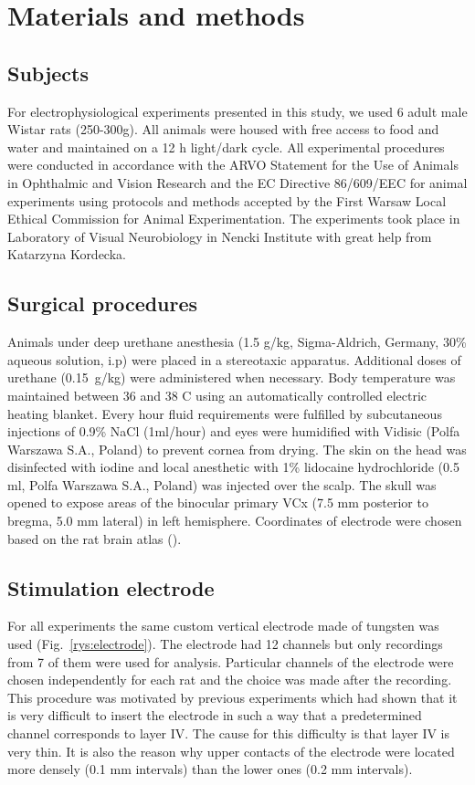 \documentclass{pracalicmgr}
\begin{document}
   \chapter{Materials and methods}   
   \section{Subjects}
   For electrophysiological experiments presented in this study, we used 6 adult male Wistar rats (250-300g). All animals were housed with free access to food and water and maintained on a 12 h light/dark cycle. All experimental procedures  were conducted in accordance with the ARVO Statement for the Use of Animals in Ophthalmic and Vision Research and  the EC Directive 86/609/EEC for animal experiments using protocols and methods accepted by the First Warsaw Local Ethical Commission for Animal Experimentation. The experiments took place in Laboratory of Visual Neurobiology in Nencki Institute with great help from Katarzyna Kordecka.
   
   
   \section{Surgical procedures}
   Animals under deep urethane anesthesia (1.5 g/kg, Sigma-Aldrich, Germany, 30\% aqueous solution, i.p) were placed in a stereotaxic apparatus. Additional doses of urethane (0.15~g/kg) were administered when necessary. Body temperature was maintained between 36 and 38 \degree C using an automatically controlled electric heating blanket. Every hour fluid requirements were fulfilled by subcutaneous injections of 0.9\% NaCl (1ml/hour) and eyes were humidified with Vidisic (Polfa Warszawa S.A., Poland) to prevent cornea from drying. The skin on the head was disinfected with iodine and local anesthetic with 1\% lidocaine hydrochloride (0.5 ml, Polfa Warszawa S.A., Poland) was injected over the scalp. The skull was opened to expose areas of the binocular primary VCx (7.5 mm posterior to bregma, 5.0 mm lateral) in left hemisphere. Coordinates of electrode were chosen based on the rat brain atlas (\cite{atlas}). 
   
   \section{Stimulation electrode}
   For all experiments the same custom vertical electrode made of tungsten was used (Fig.~\ref{rys:electrode}). The electrode had 12 channels but only recordings from 7 of them were used for analysis. Particular channels of the electrode were chosen independently for each rat and the choice was made after the recording. This procedure was motivated by previous experiments which had shown that it is very difficult to insert the electrode in such a way that a predetermined channel corresponds to layer IV. The cause for this difficulty is that layer IV is very thin. It is also the reason why upper contacts of the electrode were located more densely (0.1 mm intervals) than the lower ones (0.2 mm intervals).
   
\end{document}
